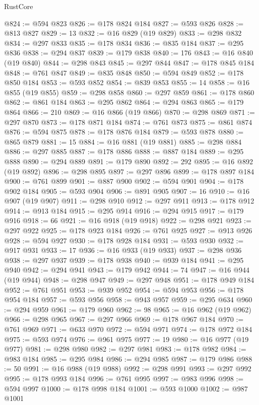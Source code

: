 \begin{lexlean}{RustCore}
\begin{coremodule}
@824 := @594 @823
@826 := @178 @824 @184
@827 := @593 @826
@828 := @813 @827
@829 := 13
@832 := @16 @829 (@19 @829)
@833 := @298 @832
@834 := @297 @833
@835 := @178 @834
@836 := @835 @184
@837 := @295 @836
@838 := @294 @837
@839 := @179 @838
@840 := 176
@843 := @16 @840 (@19 @840)
@844 := @298 @843
@845 := @297 @844
@847 := @178 @845 @184
@848 := @761 @847
@849 := @835 @848
@850 := @594 @849
@852 := @178 @850 @184
@853 := @593 @852
@854 := @839 @853
@855 := 14
@858 := @16 @855 (@19 @855)
@859 := @298 @858
@860 := @297 @859
@861 := @178 @860
@862 := @861 @184
@863 := @295 @862
@864 := @294 @863
@865 := @179 @864
@866 := 210
@869 := @16 @866 (@19 @866)
@870 := @298 @869
@871 := @297 @870
@873 := @178 @871 @184
@874 := @761 @873
@875 := @861 @874
@876 := @594 @875
@878 := @178 @876 @184
@879 := @593 @878
@880 := @865 @879
@881 := 15
@884 := @16 @881 (@19 @881)
@885 := @298 @884
@886 := @297 @885
@887 := @178 @886
@888 := @887 @184
@889 := @295 @888
@890 := @294 @889
@891 := @179 @890
@892 := 292
@895 := @16 @892 (@19 @892)
@896 := @298 @895
@897 := @297 @896
@899 := @178 @897 @184
@900 := @761 @899
@901 := @887 @900
@902 := @594 @901
@904 := @178 @902 @184
@905 := @593 @904
@906 := @891 @905
@907 := 16
@910 := @16 @907 (@19 @907)
@911 := @298 @910
@912 := @297 @911
@913 := @178 @912
@914 := @913 @184
@915 := @295 @914
@916 := @294 @915
@917 := @179 @916
@918 := 66
@921 := @16 @918 (@19 @918)
@922 := @298 @921
@923 := @297 @922
@925 := @178 @923 @184
@926 := @761 @925
@927 := @913 @926
@928 := @594 @927
@930 := @178 @928 @184
@931 := @593 @930
@932 := @917 @931
@933 := 17
@936 := @16 @933 (@19 @933)
@937 := @298 @936
@938 := @297 @937
@939 := @178 @938
@940 := @939 @184
@941 := @295 @940
@942 := @294 @941
@943 := @179 @942
@944 := 74
@947 := @16 @944 (@19 @944)
@948 := @298 @947
@949 := @297 @948
@951 := @178 @949 @184
@952 := @761 @951
@953 := @939 @952
@954 := @594 @953
@956 := @178 @954 @184
@957 := @593 @956
@958 := @943 @957
@959 := @295 @634
@960 := @294 @959
@961 := @179 @960
@962 := 98
@965 := @16 @962 (@19 @962)
@966 := @298 @965
@967 := @297 @966
@969 := @178 @967 @184
@970 := @761 @969
@971 := @633 @970
@972 := @594 @971
@974 := @178 @972 @184
@975 := @593 @974
@976 := @961 @975
@977 := 19
@980 := @16 @977 (@19 @977)
@981 := @298 @980
@982 := @297 @981
@983 := @178 @982
@984 := @983 @184
@985 := @295 @984
@986 := @294 @985
@987 := @179 @986
@988 := 50
@991 := @16 @988 (@19 @988)
@992 := @298 @991
@993 := @297 @992
@995 := @178 @993 @184
@996 := @761 @995
@997 := @983 @996
@998 := @594 @997
@1000 := @178 @998 @184
@1001 := @593 @1000
@1002 := @987 @1001

\end{coremodule}
\end{lexlean}
